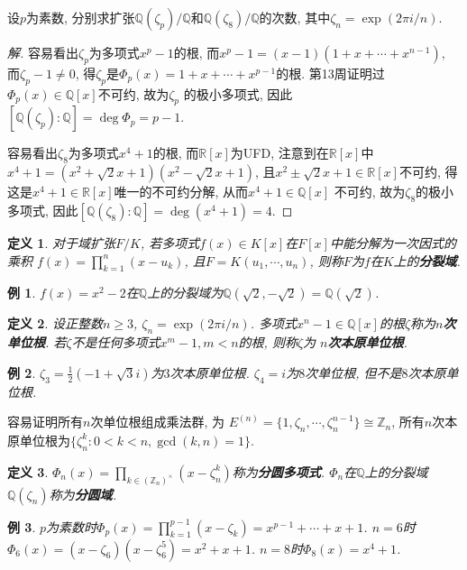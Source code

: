 \documentclass[12pt, a4paper, fontset=windows]{ctexart}
\newcommand{\Q}{\mathbb{Q}}
\newcommand{\R}{\mathbb{R}}
\newcommand{\Z}{\mathbb{Z}}
\newcommand{\isom}{\cong} %
\newcommand{\unit}[1]{{#1}^\times}
\newtheorem*{definition}{定义}
\newtheorem*{example}{例}
\newenvironment{solution}{\begin{proof}[解]}{\end{proof}}
\begin{document}
设$p$为素数, 分别求扩张$\Q(\zeta_p)/\Q$和$\Q(\zeta_8)/\Q$的次数, 
其中$\zeta_n=\exp(2\pi i/n)$. 

\begin{solution}
容易看出$\zeta_p$为多项式$x^p-1$的根, 而$x^p-1=(x-1)(1+x+\cdots+x^{n-1})$, 
而$\zeta_p-1\ne 0$, 得$\zeta_p$是$\Phi_p(x)=1+x+\cdots+x^{p-1}$的根. 
第13周证明过$\Phi_p(x)\in\Q[x]$不可约, 故为$\zeta_p$
的极小多项式, 因此$[\Q(\zeta_p):\Q]=\deg\Phi_p=p-1$. 

容易看出$\zeta_8$为多项式$x^4+1$的根, 而$\R[x]$为UFD, 
注意到在$\R[x]$中$x^4+1=(x^2+\sqrt{2}x+1)(x^2-\sqrt{2}x+1)$, 
且$x^2\pm\sqrt{2}x+1\in\R[x]$不可约, 
得这是$x^4+1\in\R[x]$唯一的不可约分解, 从而$x^4+1\in\Q[x]$
不可约, 故为$\zeta_8$的极小多项式, 
因此$[\Q(\zeta_8):\Q]=\deg(x^4+1)=4$. 
\end{solution}

\begin{definition}
对于域扩张$F/K$, 若多项式$f(x)\in K[x]$在$F[x]$中能分解为一次因式的乘积
$f(x)=\prod^n_{k=1}(x-u_k)$, 且$F=K(u_1,\cdots,u_n)$, 
则称$F$为$f$在$K$上的{\bf 分裂域}. 
\end{definition}

\begin{example}
$f(x)=x^2-2$在$\Q$上的分裂域为$\Q(\sqrt{2},-\sqrt{2})=\Q(\sqrt{2})$. 
\end{example}

\begin{definition}
设正整数$n\ge 3$, $\zeta_n=\exp(2\pi i/n)$. 
多项式$x^n-1\in\Q[x]$的根$\zeta$称为{\bf $n$次单位根}. 
若$\zeta$不是任何多项式$x^m-1,m<n$的根, 则称$\zeta$为
{\bf $n$次本原单位根}. 
\end{definition}

\begin{example}
$\zeta_3=\frac12(-1+\sqrt{3}i)$为$3$次本原单位根. 
$\zeta_4=i$为$8$次单位根, 但不是$8$次本原单位根. 
\end{example}

容易证明所有$n$次单位根组成乘法群, 为
$E^{(n)}=\{1,\zeta_n,\cdots,\zeta_n^{n-1}\}\isom\Z_n$, 
所有$n$次本原单位根为$\{\zeta_n^k:0<k<n,\gcd(k,n)=1\}$. 

\begin{definition}
$\Phi_n(x)=\prod_{k\in\unit{(\Z_n)}}(x-\zeta_n^k)$称为{\bf 分圆多项式}. 
$\Phi_n$在$\Q$上的分裂域$\Q(\zeta_n)$称为{\bf 分圆域}. 
\end{definition}

\begin{example}
$p$为素数时$\Phi_p(x)=\prod^{p-1}_{k=1}(x-\zeta_k)=x^{p-1}+\cdots+x+1$. 
$n=6$时$\Phi_6(x)=(x-\zeta_6)(x-\zeta_6^5)=x^2+x+1$. $n=8$时$\Phi_8(x)=x^4+1$. 
\end{example}
\end{document}
